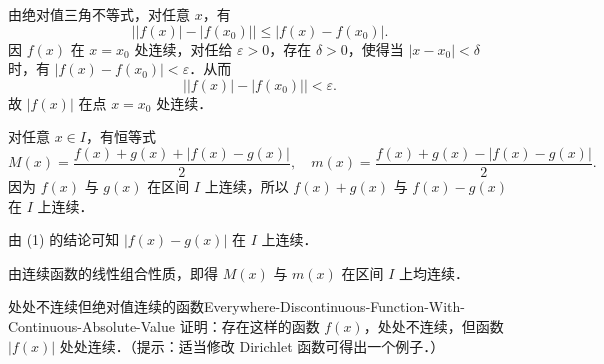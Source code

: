 \begin{myproof}

    由绝对值三角不等式，对任意 $x$，有
    \begin{equation}
        \bigl| |f(x)| - |f(x_0)| \bigr| \leqslant |f(x) - f(x_0)|.
    \end{equation}
    因 $f(x)$ 在 $x = x_0$ 处连续，对任给 $\varepsilon > 0$，存在 $\delta > 0$，使得当 $|x - x_0| < \delta$ 时，有 $|f(x) - f(x_0)| < \varepsilon$．从而
    \begin{equation}
        \bigl| |f(x)| - |f(x_0)| \bigr| < \varepsilon.
    \end{equation}
    故 $|f(x)|$ 在点 $x = x_0$ 处连续．


    对任意 $x \in I$，有恒等式
    \begin{equation}
        M(x) = \frac{f(x) + g(x) + |f(x) - g(x)|}{2}, \quad m(x) = \frac{f(x) + g(x) - |f(x) - g(x)|}{2}.
    \end{equation}
    因为 $f(x)$ 与 $g(x)$ 在区间 $I$ 上连续，所以 $f(x) + g(x)$ 与 $f(x) - g(x)$ 在 $I$ 上连续．

    由 (1) 的结论可知 $|f(x) - g(x)|$ 在 $I$ 上连续．

    由连续函数的线性组合性质，即得 $M(x)$ 与 $m(x)$ 在区间 $I$ 上均连续．
\end{myproof}

\begin{problem}{处处不连续但绝对值连续的函数}{Everywhere-Discontinuous-Function-With-Continuous-Absolute-Value}
    证明：存在这样的函数 $f(x)$，处处不连续，但函数 $|f(x)|$ 处处连续．（提示：适当修改 Dirichlet 函数可得出一个例子．）
\end{problem}

